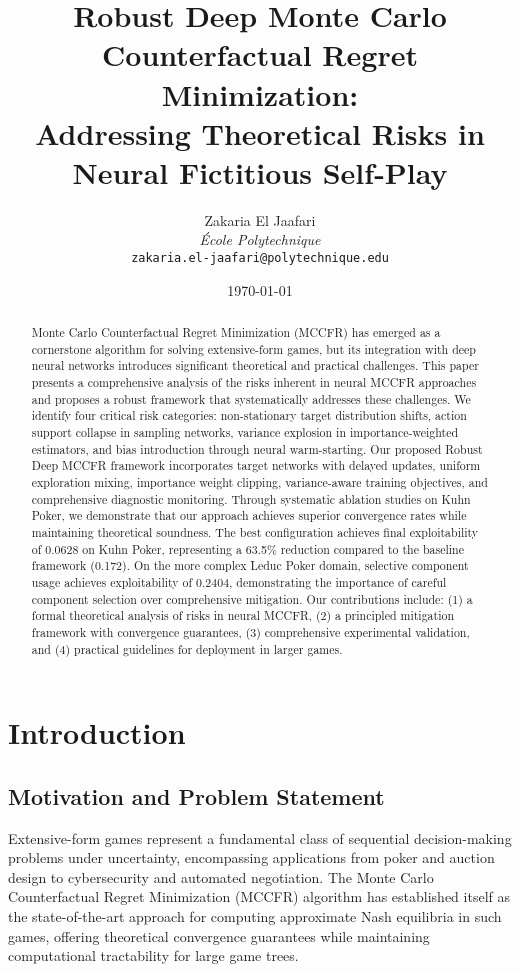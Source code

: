 \documentclass[12pt,a4paper]{article}
\title{\textbf{Robust Deep Monte Carlo Counterfactual Regret Minimization: \\ Addressing Theoretical Risks in Neural Fictitious Self-Play}}
\author{
Zakaria El Jaafari \\
\textit{École Polytechnique} \\
\texttt{zakaria.el-jaafari@polytechnique.edu}
}
\date{\today}
\begin{document}
\maketitle

\begin{abstract}
Monte Carlo Counterfactual Regret Minimization (MCCFR) has emerged as a cornerstone algorithm for solving extensive-form games, but its integration with deep neural networks introduces significant theoretical and practical challenges. This paper presents a comprehensive analysis of the risks inherent in neural MCCFR approaches and proposes a robust framework that systematically addresses these challenges. We identify four critical risk categories: non-stationary target distribution shifts, action support collapse in sampling networks, variance explosion in importance-weighted estimators, and bias introduction through neural warm-starting. Our proposed Robust Deep MCCFR framework incorporates target networks with delayed updates, uniform exploration mixing, importance weight clipping, variance-aware training objectives, and comprehensive diagnostic monitoring. Through systematic ablation studies on Kuhn Poker, we demonstrate that our approach achieves superior convergence rates while maintaining theoretical soundness. The best configuration achieves final exploitability of 0.0628 on Kuhn Poker, representing a 63.5\% reduction compared to the baseline framework (0.172). On the more complex Leduc Poker domain, selective component usage achieves exploitability of 0.2404, demonstrating the importance of careful component selection over comprehensive mitigation. Our contributions include: (1) a formal theoretical analysis of risks in neural MCCFR, (2) a principled mitigation framework with convergence guarantees, (3) comprehensive experimental validation, and (4) practical guidelines for deployment in larger games.
\end{abstract}

\tableofcontents
\newpage

\section{Introduction}

\subsection{Motivation and Problem Statement}

Extensive-form games represent a fundamental class of sequential decision-making problems under uncertainty, encompassing applications from poker and auction design to cybersecurity and automated negotiation. The Monte Carlo Counterfactual Regret Minimization (MCCFR) algorithm \citep{lanctot2009monte} has established itself as the state-of-the-art approach for computing approximate Nash equilibria in such games, offering theoretical convergence guarantees while maintaining computational tractability for large game trees.
\end{document}
